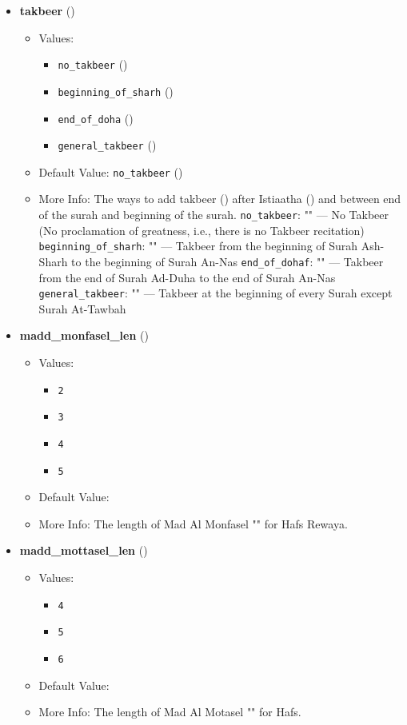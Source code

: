 \begin{itemize}
\item \textbf{takbeer} ()
  \begin{itemize}
  \item Values: 
    \begin{itemize}
    \item  \texttt{no\_takbeer} ()
    \item  \texttt{beginning\_of\_sharh} ()
    \item  \texttt{end\_of\_doha} ()
    \item  \texttt{general\_takbeer} ()
    \end{itemize}
  \item Default Value: \texttt{no\_takbeer} ()
  \item More Info: The ways to add takbeer () after Istiaatha () and between end of the surah and beginning of the surah. \texttt{no\_takbeer}: "" — No Takbeer (No proclamation of greatness, i.e., there is no Takbeer recitation) \texttt{beginning\_of\_sharh}: "" — Takbeer from the beginning of Surah Ash-Sharh to the beginning of Surah An-Nas \texttt{end\_of\_dohaf}: "" — Takbeer from the end of Surah Ad-Duha to the end of Surah An-Nas \texttt{general\_takbeer}: "" — Takbeer at the beginning of every Surah except Surah At-Tawbah
  \end{itemize}

\item \textbf{madd\_monfasel\_len} ()
  \begin{itemize}
  \item Values: 
    \begin{itemize}
    \item  \texttt{2}
    \item  \texttt{3}
    \item  \texttt{4}
    \item  \texttt{5}
    \end{itemize}
  \item Default Value: 
  \item More Info: The length of Mad Al Monfasel "" for Hafs Rewaya.
  \end{itemize}

\item \textbf{madd\_mottasel\_len} ()
  \begin{itemize}
  \item Values: 
    \begin{itemize}
    \item  \texttt{4}
    \item  \texttt{5}
    \item  \texttt{6}
    \end{itemize}
  \item Default Value: 
  \item More Info: The length of Mad Al Motasel "" for Hafs.
  \end{itemize}


\end{itemize}
